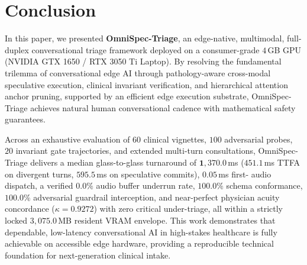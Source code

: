 \documentclass[10pt,journal,compsoc]{IEEEtran}
\begin{document}
\section{Conclusion}
\label{sec:conclusion}
In this paper, we presented \textbf{OmniSpec-Triage}, an edge-native, multimodal, full-duplex conversational triage framework deployed on a consumer-grade $4$\,GB GPU (NVIDIA GTX 1650 / RTX 3050 Ti Laptop). By resolving the fundamental trilemma of conversational edge AI through pathology-aware cross-modal speculative execution, clinical
invariant verification, and hierarchical attention anchor pruning, supported by an efficient edge execution substrate, OmniSpec-Triage achieves natural human conversational cadence with mathematical safety guarantees.

Across an exhaustive evaluation of $60$ clinical vignettes, $100$ adversarial probes, $20$ invariant gate trajectories, and extended multi-turn consultations, OmniSpec-Triage delivers a median glass-to-glass turnaround of $\mathbf{1{,}370.0}$\,ms ($451.1$\,ms TTFA on divergent turns, $595.5$\,ms on speculative commits), $0.05$\,ms first-
audio dispatch, a verified $0.0\%$ audio buffer underrun rate, $100.0\%$ schema conformance, $100.0\%$ adversarial guardrail interception, and near-perfect physician acuity concordance ($\kappa = 0.9272$) with zero critical under-triage, all within a strictly locked $3{,}075.0$\,MB resident VRAM envelope. This work demonstrates that
dependable, low-latency conversational AI in high-stakes healthcare is fully achievable on accessible edge hardware, providing a reproducible technical foundation for next-generation clinical intake.



\end{document}
